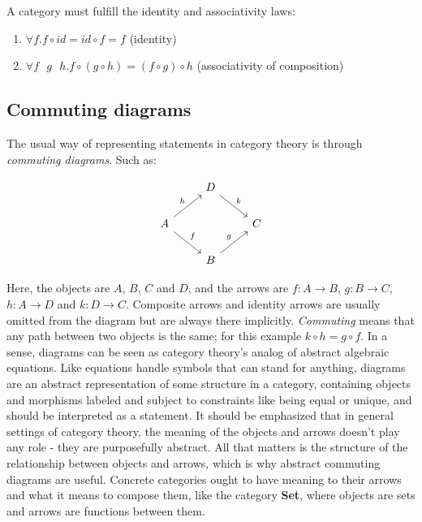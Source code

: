 A category must fulfill the identity and associativity laws:

\begin{enumerate}
  \item $ \forall f. f \circ id = id \circ f = f $ (identity)
  \item $ \forall f\text{ }g\text{ }h. f \circ (g \circ h) = (f \circ g) \circ h $ (associativity of composition)
\end{enumerate}

\subsection{Commuting diagrams}
The usual way of representing statements in category theory is through \textit{commuting diagrams}. Such as:

\[\begin{tikzcd}
	& D \\
	A && C \\
	& B
	\arrow["f", from=2-1, to=3-2]
	\arrow["g", from=3-2, to=2-3]
	\arrow["h", from=2-1, to=1-2]
	\arrow["k", from=1-2, to=2-3]
\end{tikzcd}\]

Here, the objects are $ A $, $ B $, $ C $ and $ D $, and the arrows are $ f : A \rightarrow B $, $ g : B \rightarrow C $, $ h : A \rightarrow D $ and $ k : D \rightarrow C $. Composite arrows and identity arrows are usually omitted from the diagram but are always there implicitly. \textit{Commuting} means that any path between two objects is the same; for this example $ k \circ h = g \circ f $. In a sense, diagrams can be seen as category theory's analog of abstract algebraic equations. Like equations handle symbols that can stand for anything, diagrams are an abstract representation of some structure in a category, containing objects and morphisms labeled and subject to constraints like being equal or unique, and should be interpreted as a statement. It should be emphasized that in general settings of category theory, the meaning of the objects and arrows doesn't play any role - they are purposefully abstract. All that matters is the structure of the relationship between objects and arrows, which is why abstract commuting diagrams are useful. Concrete categories ought to have meaning to their arrows and what it means to compose them, like the category \textbf{Set}, where objects are sets and arrows are functions between them. 

